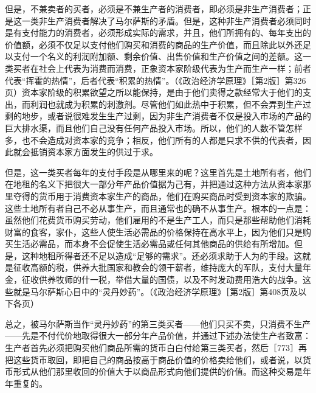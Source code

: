 但是，不兼卖者的买者，必须是不兼生产者的消费者，即必须是非生产消费者；正是这一类非生产消费者解决了马尔萨斯的矛盾。但是，这种非生产消费者必须同时是有支付能力的消费者，必须形成实际的需求，并且，他们所拥有的、每年支出的价值额，必须不仅足以支付他们购买和消费的商品的生产价值，而且除此以外还足以支付一个名义的利润附加额、剩余价值、出售价值和生产价值之间的差额。这一类买者在社会上代表为消费而消费，正象资本家阶级代表为生产而生产一样；前者代表“挥霍的热情”，后者代表“积累的热情”。（《政治经济学原理》［第2版］第326页）资本家阶级的积累欲望之所以能保持，是由于他们卖得之款经常大于他们的支出，而利润也就成为积累的刺激剂。尽管他们如此热中于积累，但不会弄到生产过剩的地步，或者说很难发生生产过剩，因为非生产消费者不仅是投入市场的产品的巨大排水渠，而且他们自己没有任何产品投入市场。所以，他们的人数不管怎样多，也不会造成对资本家的竞争；相反，他们所有的人都是只求不供的代表者，因此就会抵销资本家方面发生的供过于求。

但是，这一类买者每年的支付手段是从哪里来的呢？这里首先是土地所有者，他们在地租的名义下把很大一部分年产品价值据为己有，并把通过这种方法从资本家那里夺得的货币用于消费资本家生产的商品，他们在购买商品时受到资本家的欺骗。这些土地所有者自己不必从事生产，而且通常也的确不从事生产。根本的一点是：虽然他们花费货币购买劳动，他们雇用的不是生产工人，而只是那些帮助他们消耗财富的食客，家仆，这些人使生活必需品的价格保持在高水平上，因为他们只是购买生活必需品，而本身不会促使生活必需品或任何其他商品的供给有所增加。但是，这种地租所得者还不足以造成“足够的需求”。还必须求助于人为的手段。这就是征收高额的税，供养大批国家和教会的领干薪者，维持庞大的军队，支付大量年金，征收供养牧师的什一税，举借大量的国债，以及不时发动费用浩大的战争。这些就是马尔萨斯心目中的“灵丹妙药”。（《政治经济学原理》［第2版］第408页及以下各页）

总之，被马尔萨斯当作“灵丹妙药”的第三类买者——他们只买不卖，只消费不生产——先是不付代价地取得很大一部分年产品价值，并通过下述办法使生产者致富：生产者首先必须把购买他们商品所需的货币白白付给第三类买者，然后［773］再把这些货币取回，即把自己的商品按高于商品价值的价格卖给他们，或者说，以货币形式从他们那里收回的价值大于以商品形式向他们提供的价值。而这种交易是年年重复的。


